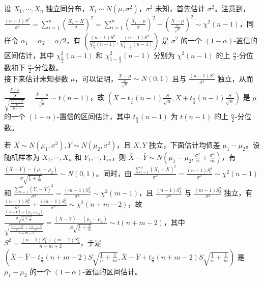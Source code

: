 \documentclass[../main.tex]{subfiles}
\begin{document}
\begin{example}
    设 $X_1,\cdots,X_n$ 独立同分布，$X_i\sim N(\mu,\sigma^2)$，$\sigma^2$ 未知，首先估计 $\sigma^2$。注意到，$\frac{(n-1)S^2}{\sigma^2}=\sum_{i=1}^n\left(\frac{X_i-\bar X}{\sigma}\right)^2=\sum_{i=1}^n\left(\frac{X_i-\mu}{\sigma}\right)^2-\left(\frac{\bar X-\mu}{\frac\sigma{\sqrt{n}}}\right)^2\sim\chi^2(n-1)$，同样令 $\alpha_1=\alpha_2=\alpha/2$，有 $(\frac{(n-1)S^2}{\chi^2_{\frac\alpha2}(n-1)},\frac{(n-1)S^2}{\chi^2_{1-\frac\alpha2}(n-1)})$ 是 $\sigma^2$ 的一个 $(1-\alpha)$-置信的区间估计，其中 $\chi^2_{\frac\alpha2}(n-1)$ 和 $\chi^2_{1-\frac\alpha2}(n-1)$ 分别为 $\chi^2(n-1)$ 的上 $\frac\alpha2$-分位数和下 $\frac\alpha2$-分位数。\\
    接下来估计未知参数 $\mu$，可以证明，$\frac{\bar X-\mu}{\frac\sigma{\sqrt{n}}}\sim N(0,1)$ 且与 $\frac{(n-1)S^2}{\sigma^2}$ 独立，从而 $\frac{\frac{\bar X-\mu}{\frac\sigma{\sqrt{n}}}}{\sqrt{\frac{\frac{(n-1)S^2}{\sigma^2}}{n-1}}}=\frac{\bar X-\mu}{\frac S{\sqrt{n}}}\sim t(n-1)$，故 $(\bar X-t_{\frac\alpha2}(n-1)\frac S{\sqrt{n}},\bar X+t_{\frac\alpha2}(n-1)\frac S{\sqrt{n}})$ 是 $\mu$ 的一个 $(1-\alpha)$-置信的区间估计，其中 $t_{\frac\alpha2}(n-1)$ 为 $t(n-1)$ 的上 $\frac\alpha2$-分位数。
\end{example}

\begin{example}
    若 $X\sim N(\mu_1,\sigma^2),Y\sim N(\mu_2,\sigma^2)$，且 $X,Y$ 独立，下面估计均值差 $\mu_1-\mu_2$。设随机样本为 $X_1,\cdots,X_n$ 和 $Y_1,\cdots,Y_m$，则 $\bar X-\bar Y\sim N(\mu_1-\mu_2,\frac{\sigma^2}n+\frac{\sigma^2}m)$，有 $\frac{(\bar X-\bar Y)-(\mu_1-\mu_2)}{\sigma\sqrt{\frac1n+\frac1m}}\sim N(0,1)$。同时，由 $\frac{\sum_{i=1}^n(X_i-\bar X)^2}{\sigma^2}=\frac{(n-1)S_1^2}{\sigma^2}\sim\chi^2(n-1)$ 和 $\frac{\sum_{i=1}^m(Y_i-\bar Y)^2}{\sigma^2}= \frac{(m-1)S_2^2}{\sigma^2}\sim\chi^2(m-1)$，且 $\frac{(n-1)S_1^2}{\sigma^2}$ 与 $\frac{(m-1)S_2^2}{\sigma^2}$ 独立，有 $\frac{(n-1)S_1^2}{\sigma^2}+\frac{(m-1)S_2^2}{\sigma^2}\sim\chi^2(n+m-2)$，故 $\frac{\frac{(\bar X-\bar Y)-(\mu_1-\mu_2)}{\sigma\sqrt{\frac1n+\frac1m}}}{\sqrt{\frac{\frac{(n-1)S_1^2}{\sigma^2}+\frac{(m-1)S_2^2}{\sigma^2}}{n+m-2}}}=\frac{(\bar X-\bar Y)-(\mu_1-\mu_2)}{S\sqrt{\frac1n+\frac1m}}\sim t(n+m-2)$，其中 $S^2=\frac{(n-1)S_1^2+(m-1)S_2^2}{n-m+2}$，于是 $(\bar X-\bar Y-t_{\frac\alpha2}(n+m-2)S\sqrt{\frac1n+\frac1m},\bar X-\bar Y+t_{\frac\alpha2}(n+m-2)S\sqrt{\frac1n+\frac1m})$ 是 $\mu_1-\mu_2$ 的一个 $(1-\alpha)$-置信的区间估计。
\end{example}
\end{document}
